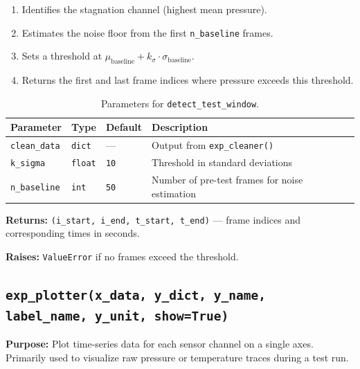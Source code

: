 \documentclass[11pt, letterpaper]{article}
\begin{document}
\begin{enumerate}[nosep]
    \item Identifies the stagnation channel (highest mean pressure).
    \item Estimates the noise floor from the first \texttt{n\_baseline}
          frames.
    \item Sets a threshold at $\mu_{\text{baseline}} + k_\sigma \cdot
          \sigma_{\text{baseline}}$.
    \item Returns the first and last frame indices where pressure exceeds
          this threshold.
\end{enumerate}

\begin{table}[h!]
\centering
\caption{Parameters for \texttt{detect\_test\_window}.}
\begin{tabular}{@{}llll@{}}
\toprule
\textbf{Parameter} & \textbf{Type} & \textbf{Default} & \textbf{Description} \\
\midrule
\texttt{clean\_data} & \texttt{dict}  & ---        & Output from \texttt{exp\_cleaner()} \\
\texttt{k\_sigma}    & \texttt{float} & \texttt{10}  & Threshold in standard deviations \\
\texttt{n\_baseline} & \texttt{int}   & \texttt{50}  & Number of pre-test frames for noise estimation \\
\bottomrule
\end{tabular}
\end{table}

\textbf{Returns:} \texttt{(i\_start, i\_end, t\_start, t\_end)} ---
frame indices and corresponding times in seconds.

\textbf{Raises:} \texttt{ValueError} if no frames exceed the threshold.

\subsection{\texttt{exp\_plotter(x\_data, y\_dict, y\_name, label\_name, y\_unit, show=True)}}
\label{subsec:exp_plotter}

\textbf{Purpose:} Plot time-series data for each sensor channel on a
single axes. Primarily used to visualize raw pressure or temperature
traces during a test run.
\end{document}
